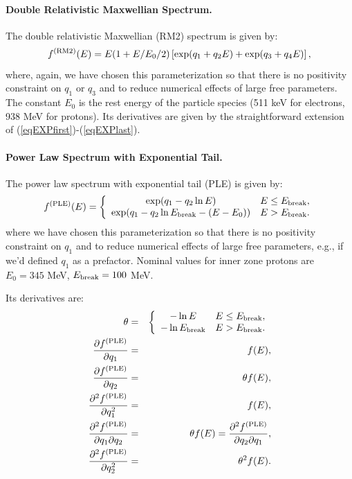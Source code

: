 \documentclass{article}    %
\newcommand{\subsubsubsection}[1]{\paragraph{#1.}}
\begin{document}
\subsubsubsection{Double Relativistic Maxwellian Spectrum}

The double relativistic Maxwellian (RM2) spectrum is given by:
\begin{equation}
f^{\rm (RM2)}(E) = E(1+E/E_0/2)\left[ \exp(q_1 + q_2 E) + \exp(q_3 + q_4 E) \right],
\end{equation}
where, again, we have chosen this parameterization so that there is no
positivity constraint on $q_1$ or $q_3$ and to reduce numerical effects
of large free parameters. The constant $E_0$ is the rest energy of the
particle species (511 keV for electrons, 938 MeV for protons).  Its
derivatives are given by the straightforward extension of
(\ref{eqEXPfirst})-(\ref{eqEXPlast}).

\subsubsubsection{Power Law Spectrum with Exponential Tail}

The power law spectrum with exponential tail (PLE) is given by:
\begin{equation}
f^{\rm (PLE)}(E) = \left\{\begin{array}{cl}
\exp(q_1 - q_2\ln E) & E \le E_{\rm break}, \\
\exp(q_1 - q_2\ln E_{\rm break} - (E-E_0)) & E > E_{\rm break}.
\end{array}
\right.
\end{equation}
where we have chosen this parameterization so that there is no
positivity constraint on $q_1$ and to reduce numerical effects of
large free parameters, e.g., if we'd defined $q_1$ as a prefactor.
Nominal values for inner zone protons are $E_0 = 345$ MeV, $E_{\rm
  break} = 100$ MeV.

Its derivatives are:
\begin{eqnarray}
\theta &=& \left\{\begin{array}{cl}
-\ln E & E \le E_{\rm break}, \\
-\ln E_{\rm break} & E > E_{\rm break}.
\end{array}
\right. \\
\frac{\partial f^{\rm (PLE)}}{\partial q_1} &=& f(E), \\
\frac{\partial f^{\rm (PLE)}}{\partial q_2} &=& \theta f(E), \\
\frac{\partial^2 f^{\rm (PLE)}}{\partial q_1^2} &=& f(E), \\
\frac{\partial^2 f^{\rm (PLE)}}{\partial q_1\partial q_2} &=& \theta f(E) 
= \frac{\partial^2 f^{\rm (PLE)}}{\partial q_2\partial q_1}, \\
\frac{\partial^2 f^{\rm (PLE)}}{\partial q_2^2} &=& \theta^2 f(E).
\end{eqnarray}
\end{document}

